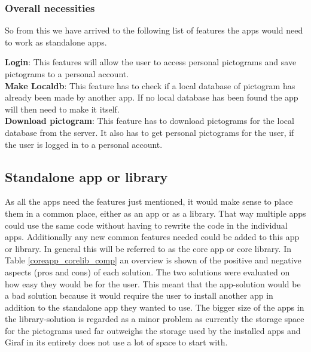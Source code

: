 \subsubsection{Overall necessities}
So from this we have arrived to the following list of features the apps would need to work as standalone apps. 

\textbf{Login}: This features will allow the user to access personal pictograms and save pictograms to a personal account.\\
\textbf{Make Localdb}: This feature has to check if a local database of pictogram has already been made by another app. If no local database has been found the app will then need to make it itself.\\
\textbf{Download pictogram}: This feature has to download pictograms for the local database from the server. It also has to get personal pictograms for the user, if the user is logged in to a personal account.

\subsection{Standalone app or library}
As all the apps need the features just mentioned, it would make sense to place them in a common place, either as an app or as a library. That way multiple apps could use the same code without having to rewrite the code in the individual apps. Additionally any new common features needed could be added to this app or library. In general this will be referred to as the core app or core library.
In Table \ref{coreapp_corelib_comp} an overview is shown of the positive and negative aspects (pros and cons) of each solution. The two solutions were evaluated on how easy they would be for the user. This meant that the app-solution would be a bad solution because it would require the user to install another app in addition to the standalone app they wanted to use. The bigger size of the apps in the library-solution is regarded as a minor problem as currently the storage space for the pictograms used far outweighs the storage used by the installed apps and Giraf in its entirety does not use a lot of space to start with.

